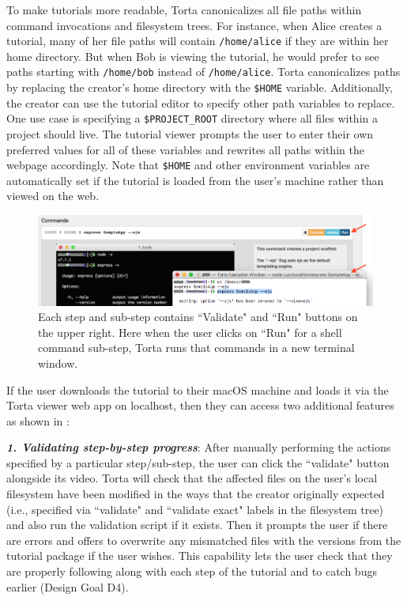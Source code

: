 To make tutorials more readable, Torta canonicalizes all file paths
within command invocations and filesystem trees. For instance, when
Alice creates a tutorial, many of her file paths will contain {\small
\texttt{/home/alice}} if they are within her home directory. But when
Bob is viewing the tutorial, he would prefer to see paths starting with
{\small \texttt{/home/bob}} instead of {\small \texttt{/home/alice}}.
Torta canonicalizes paths by replacing the creator's home directory with
the \texttt{\$HOME} variable. Additionally, the creator can use the
tutorial editor to specify other path variables to replace. One use case
is specifying a \texttt{\$PROJECT\_ROOT} directory where all files
within a project should live. The tutorial viewer prompts the user to
enter their own preferred values for all of these variables and rewrites
all paths within the webpage accordingly. Note that \texttt{\$HOME} and
other environment variables are automatically set if the tutorial is
loaded from the user's machine rather than viewed on the web.


\begin{figure}

\includegraphics[width=\columnwidth]{figures/torta/view-and-run.png}

\caption{Each step and sub-step contains ``Validate" and ``Run" buttons
on the upper right. Here when the user clicks on ``Run" for a shell
command sub-step, Torta runs that commands in a new terminal window.}

\label{fig:torta-player}
\vspace{-1em} %
\end{figure}


If the user downloads the tutorial to their macOS machine and loads it
via the Torta viewer web app on localhost, then they can access two additional features as shown
in :

\emph{\textbf{1. Validating step-by-step progress}}: After manually
performing the actions specified by a particular step/sub-step, the user
can click the ``validate" button alongside its video. Torta will check
that the affected files on the user's local filesystem have been
modified in the ways that the creator originally expected (i.e.,
specified via ``validate" and ``validate exact" labels in the filesystem
tree) and also run the validation script if it exists. Then it prompts the user if
there are errors and offers to overwrite any mismatched files with
the versions from the tutorial package if the user wishes. This
capability lets the user check that they are properly following along
with each step of the tutorial and to catch bugs earlier (Design Goal
D4).

